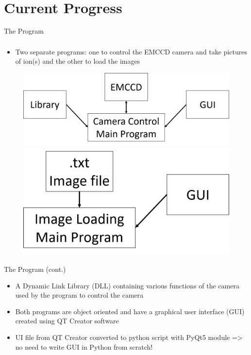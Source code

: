 \documentclass{beamer}
\begin{document}
\section{Current Progress}
\begin{frame}{The Program}
\frametitle{}

\begin{itemize}
\item Two separate programs: one to control the EMCCD camera and take pictures of ion(s) and the other to load the images 
\end{itemize} 
\vspace{0.3cm}
\begin{figure}
\begin{center}
\includegraphics[scale=0.3]{Figures/cam_flow_chart.png}\\
\vspace{0.3cm}
\includegraphics[scale=0.3]{Figures/img_load_flow_chart.png}
\end{center}
\end{figure}


\end{frame}

\begin{frame}{The Program (cont.)}

\begin{itemize}
\item A Dynamic Link Library (DLL) containing various functions of the camera used by the program to control the camera
\bigskip
\item Both programs are object oriented and have a graphical user interface (GUI) created using QT Creator software
\bigskip
\item UI file from QT Creator converted to python script with PyQt5 module => no need to write GUI in Python from scratch!
\end{itemize}


\end{frame}
\end{document}
